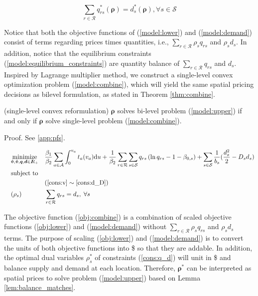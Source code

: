 \documentclass[review]{elsarticle}
\begin{document}
\begin{equation}
\label{model:equilibrium_constraints}
\sum_{r \in \mathcal{R}} q_{rs}^{\ast}(\bm{\rho}) = d_s^{\ast}(\bm{\rho}), \forall s \in \mathcal{S}
\end{equation}

Notice that both the objective functions of (\ref{model:lower}) and (\ref{model:demand}) consist of terms regarding prices times quantities, i.e., $\sum_{r \in \mathcal{R}}\rho_sq_{rs}$ and $\rho_sd_s$. In addition, notice that the equilibrium constraints (\ref{model:equilibrium_constraints}) are quantity balance of $\sum_{r \in \mathcal{R}}q_{rs}$ and $d_s$. Inspired by Lagrange multiplier method, we construct a single-level convex optimization problem (\ref{model:combine}), which will yield the same spatial pricing decisions as bilevel formulation, as stated in Theorem \ref{thm:combine}.

\begin{theorem}{(single-level convex reformulation)}\label{thm:combine}
$\bm{\rho}$ solves bi-level problem (\ref{model:upper}) if and only if $\bm{\rho}$ solve single-level problem (\ref{model:combine}).
\end{theorem}

\state Proof. See \ref{app:pfs}. %

\begin{subequations}
\begin{align}
& & & \underset{\bm{\hat{v}},\bm{\check{v}}, \bm{q}, \bm{d} \in {I\kern-.35em R}_+}{\text{minimize}}
& & \frac{\beta_1}{\beta_2}\sum_{a \in \mathcal{A}} \int_{0}^{v_a} t_a(v_a) \mathrm{d}u + \frac{1}{\beta_2} \sum_{r \in \mathcal{R}}\sum_{s \in \mathcal{S}} q_{rs}\left(\ln q_{rs} - 1 - \beta_{0,s}\right) + \sum_{s \in \mathcal{S}}\frac{1}{b_s}(\frac{d_s^2}{2} - D_sd_s)\label{obj:combine} \\
& & & \text{subject to} \nonumber & & \\
& & & & & (\ref{cons:v} \sim \ref{cons:d_D}) \nonumber\\
& & & ({\rho}_{s})& &  \sum_{r \in \mathcal{R}} q_{rs} = d_s,\; \forall s\label{cons:q_d}
\end{align}
\label{model:combine}
\end{subequations}

The objective function (\ref{obj:combine}) is a combination of scaled objective functions (\ref{obj:lower}) and (\ref{model:demand}) without $\sum_{r \in \mathcal{R}}\rho_sq_{rs}$ and $\rho_sd_s$ terms. The purpose of scaling (\ref{obj:lower}) and (\ref{model:demand}) is to convert the units of both objective functions into \$ so that they are addable. In addition, the optimal dual variables $\rho_s^{*}$ of constraints (\ref{cons:q_d}) will unit in \$ and balance supply and demand at each location. Therefore, $\bm{\rho}^{*}$ can be interpreted as spatial prices to solve problem (\ref{model:upper}) based on Lemma \ref{lem:balance_matches}.
\end{document}
